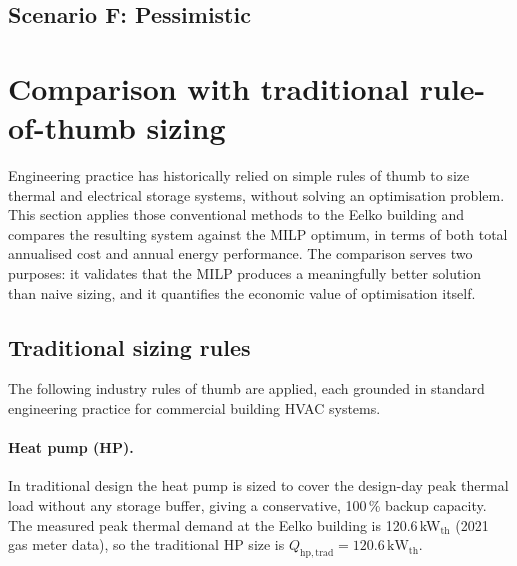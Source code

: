 \documentclass[11pt,a4paper]{report}
\begin{document}

\subsection{Scenario F: Pessimistic}
\label{sub:scenario_pessimistic}


\section{Comparison with traditional rule-of-thumb sizing}
\label{sec:results_traditional}

Engineering practice has historically relied on simple rules of thumb to size
thermal and electrical storage systems, without solving an optimisation problem.
This section applies those conventional methods to the Eelko building and compares
the resulting system against the MILP optimum, in terms of both total annualised
cost and annual energy performance.
The comparison serves two purposes: it validates that the MILP produces a
meaningfully better solution than naive sizing, and it quantifies the economic value
of optimisation itself.

\subsection{Traditional sizing rules}
\label{sub:trad_rules}

The following industry rules of thumb are applied, each grounded in standard
engineering practice for commercial building HVAC systems.

\paragraph{Heat pump (HP).}
In traditional design the heat pump is sized to cover the design-day peak thermal
load without any storage buffer, giving a conservative, 100\,\% backup capacity.
The measured peak thermal demand at the Eelko building is
120.6\,kW$_\mathrm{th}$ (2021 gas meter data), so the traditional HP size is
$Q_\mathrm{hp,trad} = 120.6\,\mathrm{kW_{th}}$.
\end{document}
